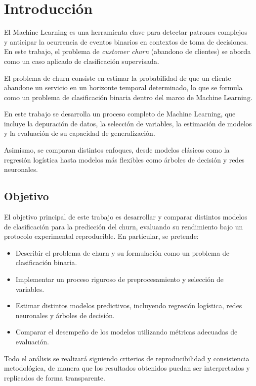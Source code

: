 \section{Introducción}

El Machine Learning es una herramienta clave para detectar patrones complejos y anticipar la ocurrencia de eventos binarios en contextos de toma de decisiones. En este trabajo, el problema de \textit{customer churn} (abandono de clientes) se aborda como un caso aplicado de clasificación supervisada.

El problema de churn consiste en estimar la probabilidad de que un cliente abandone un servicio en un horizonte temporal determinado, lo que se formula como un problema de clasificación binaria dentro del marco de Machine Learning.

En este trabajo se desarrolla un proceso completo de Machine Learning, que incluye la depuración de datos, la selección de variables, la estimación de modelos y la evaluación de su capacidad de generalización.

Asimismo, se comparan distintos enfoques, desde modelos clásicos como la regresión logística hasta modelos más flexibles como árboles de decisión y redes neuronales.
\subsection{Objetivo}

El objetivo principal de este trabajo es desarrollar y comparar distintos modelos de clasificación para la predicción del churn, evaluando su rendimiento bajo un protocolo experimental reproducible. En particular, se pretende:

\begin{itemize}
    \item Describir el problema de churn y su formulación como un problema de clasificación binaria.
    \item Implementar un proceso riguroso de preprocesamiento y selección de variables.
    \item Estimar distintos modelos predictivos, incluyendo regresión logística, redes neuronales y árboles de decisión.
    \item Comparar el desempeño de los modelos utilizando métricas adecuadas de evaluación.
\end{itemize}

Todo el análisis se realizará siguiendo criterios de reproducibilidad y consistencia metodológica, de manera que los resultados obtenidos puedan ser interpretados y replicados de forma transparente.
